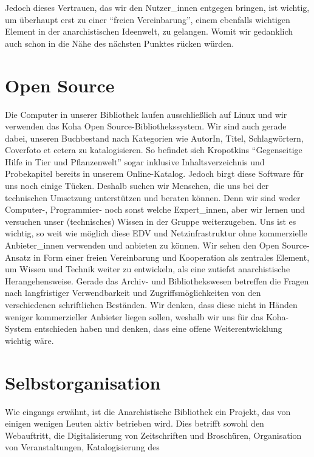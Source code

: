 \documentclass[a4paper,
fontsize=11pt,
oneside,
numbers=noperiodatend,
parskip=half-,
bibliography=totoc,
final
]{scrartcl}
\begin{document}
Jedoch dieses Vertrauen, das wir den Nutzer\_innen entgegen bringen, ist
wichtig, um überhaupt erst zu einer \enquote{freien Vereinbarung}, einem
ebenfalls wichtigen Element in der anarchistischen Ideenwelt, zu
gelangen. Womit wir gedanklich auch schon in die Nähe des nächsten
Punktes rücken würden.

\section*{Open Source}\label{open-source}

Die Computer in unserer Bibliothek laufen ausschließlich auf Linux und
wir verwenden das Koha Open Source-Bibliothekssystem. Wir sind auch
gerade dabei, unseren Buchbestand nach Kategorien wie AutorIn, Titel,
Schlagwörtern, Coverfoto et cetera zu katalogisieren. So befindet sich
Kropotkins \enquote{Gegenseitige Hilfe in Tier und Pflanzenwelt} sogar
inklusive Inhaltsverzeichnis und Probekapitel bereits in unserem
Online-Katalog. Jedoch birgt diese Software für uns noch einige Tücken.
Deshalb suchen wir Menschen, die uns bei der technischen Umsetzung
unterstützen und beraten können. Denn wir sind weder Computer-,
Programmier- noch sonst welche Expert\_innen, aber wir lernen und
versuchen unser (technisches) Wissen in der Gruppe weiterzugeben. Uns
ist es wichtig, so weit wie möglich diese EDV und Netzinfrastruktur ohne
kommerzielle Anbieter\_innen verwenden und anbieten zu können. Wir sehen
den Open Source-Ansatz in Form einer freien Vereinbarung und Kooperation
als zentrales Element, um Wissen und Technik weiter zu entwickeln, als
eine zutiefst anarchistische Herangehensweise. Gerade das Archiv- und
Bibliothekswesen betreffen die Fragen nach langfristiger Verwendbarkeit
und Zugriffsmöglichkeiten von den verschiedenen schriftlichen Beständen.
Wir denken, dass diese nicht in Händen weniger kommerzieller Anbieter
liegen sollen, weshalb wir uns für das Koha-System entschieden haben und
denken, dass eine offene Weiterentwicklung wichtig wäre.

\section*{Selbstorganisation}\label{selbstorganisation}

Wie eingangs erwähnt, ist die Anarchistische Bibliothek ein Projekt, das
von einigen wenigen Leuten aktiv betrieben wird. Dies betrifft sowohl
den Webauftritt, die Digitalisierung von Zeitschriften und Broschüren,
Organisation von Veranstaltungen, Katalogisierung des
\end{document}
